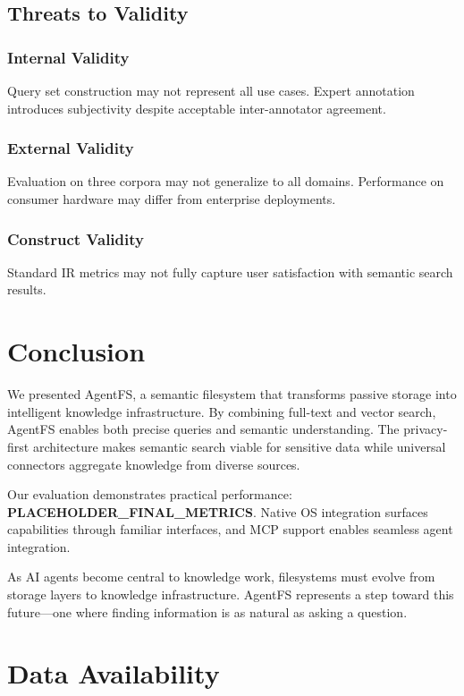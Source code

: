 \documentclass[conference]{IEEEtran}
\begin{document}
\subsection{Threats to Validity}

\subsubsection{Internal Validity}
Query set construction may not represent all use cases. Expert annotation introduces subjectivity despite acceptable inter-annotator agreement.

\subsubsection{External Validity}
Evaluation on three corpora may not generalize to all domains. Performance on consumer hardware may differ from enterprise deployments.

\subsubsection{Construct Validity}
Standard IR metrics may not fully capture user satisfaction with semantic search results.

\section{Conclusion}

We presented AgentFS, a semantic filesystem that transforms passive storage into intelligent knowledge infrastructure. By combining full-text and vector search, AgentFS enables both precise queries and semantic understanding. The privacy-first architecture makes semantic search viable for sensitive data while universal connectors aggregate knowledge from diverse sources.

Our evaluation demonstrates practical performance: \textbf{PLACEHOLDER\_FINAL\_METRICS}. Native OS integration surfaces capabilities through familiar interfaces, and MCP support enables seamless agent integration.

As AI agents become central to knowledge work, filesystems must evolve from storage layers to knowledge infrastructure. AgentFS represents a step toward this future---one where finding information is as natural as asking a question.

\section*{Data Availability}
\end{document}
